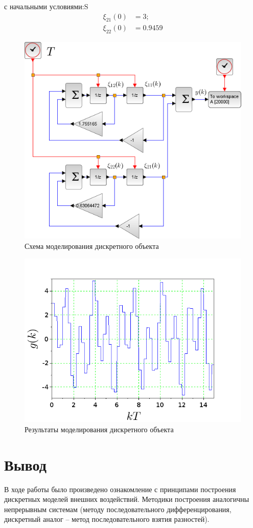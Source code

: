 \documentclass[a4paper,14pt]{extreport}
\begin{document}
с начальными условиями:S
\begin{align}
\xi_{21}(0) &= 	3;\\	
\xi_{22}(0) &= 0.9459
\end{align}

\begin{figure}[H]
	\center\includegraphics[width=0.68\linewidth]{b.png}
	\caption{Схема моделирования дискретного объекта}
	\label{fig:scr1}
\end{figure}

\begin{figure}[H]
	\center\includegraphics[width=0.7\linewidth]{b_res.png}
	\caption{Результаты моделирования дискретного объекта}
	\label{fig:scr1}
\end{figure}

\section*{Вывод}
В ходе работы было произведено ознакомление с принципами построения дискретных моделей внешних воздействий. Методики построения аналогичны непрерывным системам (методу последовательного дифференцирования, дискретный аналог – метод последовательного взятия разностей).
\end{document}
